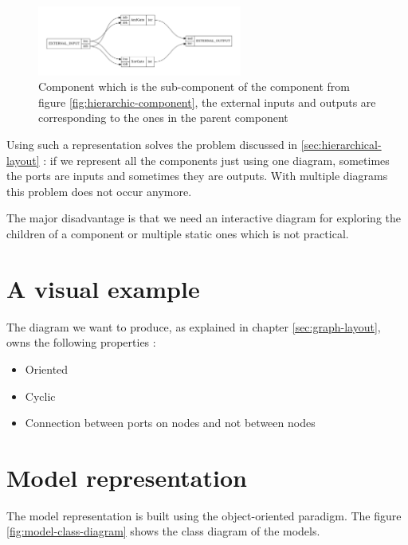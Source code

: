 \begin{figure}[H]
  \centering
  \includegraphics[width=0.6\textwidth]{img/AndXorGate.pdf}
  \caption[SpinalHDL Component inside an another]{Component which is the
    sub-component of the component from figure \ref{fig:hierarchic-component},
    the external inputs and outputs are corresponding to the ones in the parent component}
  \label{fig:and-xor-gate}
\end{figure}

Using such a representation solves the problem discussed in
\ref{sec:hierarchical-layout} : if we represent all the components just using
one diagram, sometimes the ports are inputs and sometimes they are outputs. With
multiple diagrams this problem does not occur anymore.

The major disadvantage is that we need an interactive diagram for exploring
the children of a component or multiple static ones which is not practical.

\section{A visual example}

The diagram we want to produce, as explained in chapter \ref{sec:graph-layout}, owns the following properties :
\begin{itemize}
  \item Oriented
  \item Cyclic
  \item Connection between ports on nodes and not between nodes
\end{itemize}

\section{Model representation}
\label{sec:model-representation} 

The model representation is built using the object-oriented paradigm. The
figure \ref{fig:model-class-diagram} shows the class diagram of the models.

